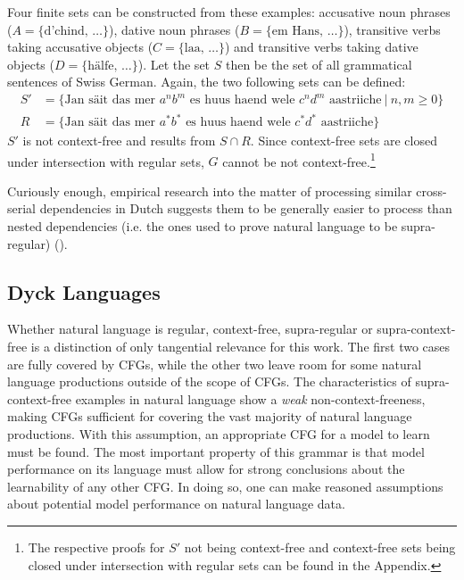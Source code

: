 Four finite sets can be constructed from these examples: accusative noun phrases ($A = \lbrace \text{d'chind}, \, \dots \rbrace$), dative noun phrases ($B = \lbrace \text{em Hans}, \, \dots \rbrace$), transitive verbs taking accusative objects ($C = \lbrace \text{laa}, \, \dots \rbrace$) and transitive verbs taking dative objects ($D = \lbrace \text{hälfe}, \, \dots \rbrace$). Let the set $S$ then be the set of all grammatical sentences of Swiss German. Again, the two following sets can be defined:
\begin{align*}
S' &= \lbrace \text{Jan säit das mer } a^{n}b^{m} \text{ es huus haend wele } c^{n}d^{m} \text{ aastriiche} \: \vert \: n, m \geq 0 \rbrace \\
R &= \lbrace \text{Jan säit das mer } a^{*}b^{*} \text{ es huus haend wele } c^{*}d^{*} \text{ aastriiche} \rbrace
\end{align*}
$S'$ is not context-free and results from $S \cap R$. Since context-free sets are closed under intersection with regular sets, $G$ cannot be not context-free.\footnote{The respective proofs for $S'$ not being context-free and context-free sets being closed under intersection with regular sets can be found in the Appendix.}

Curiously enough, empirical research into the matter of processing similar cross-serial dependencies in Dutch suggests them to be generally easier to process than nested dependencies (i.e. the ones used to prove natural language to be supra-regular) (\cite{Bach1986}).

\subsection{Dyck Languages}\label{dyckLanguages}
Whether natural language is regular, context-free, supra-regular or supra-context-free is a distinction of only tangential relevance for this work. The first two cases are fully covered by CFGs, while the other two leave room for some natural language productions outside of the scope of CFGs. The characteristics of supra-context-free examples in natural language show a \textit{weak} non-context-freeness, making CFGs sufficient for covering the vast majority of natural language productions. With this assumption, an appropriate CFG for a model to learn must be found. The most important property of this grammar is that model performance on its language must allow for strong conclusions about the learnability of any other CFG. In doing so, one can make reasoned assumptions about potential model performance on natural language data. 

